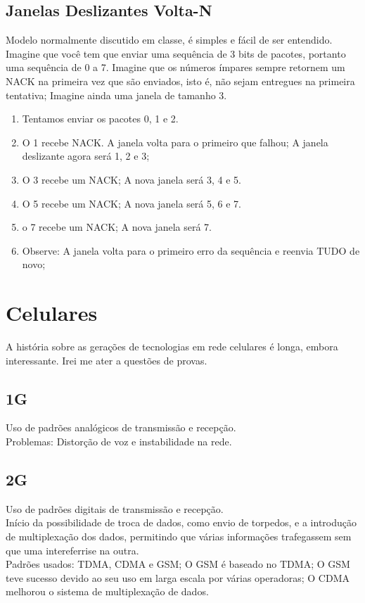 \documentclass{article}
\begin{document}
\subsection{Janelas Deslizantes Volta-N}
Modelo normalmente discutido em classe, é simples e fácil de ser entendido.\\
Imagine que você tem que enviar uma sequência de 3 bits de pacotes, portanto uma sequência de 0 a 7. Imagine que os números ímpares sempre retornem um NACK na primeira vez que são enviados, isto é, não sejam entregues na primeira tentativa; Imagine ainda uma janela de tamanho 3.\\
\begin{enumerate}
	\item Tentamos enviar os pacotes 0, 1 e 2.
	\item O 1 recebe NACK. A janela volta para o primeiro que falhou; A janela deslizante agora será 1, 2 e 3;
	\item O 3 recebe um NACK; A nova janela será 3, 4 e 5.
	\item O 5 recebe um NACK; A nova janela será 5, 6 e 7.
	\item o 7 recebe um NACK; A nova janela será 7.
	\item Observe: A janela volta para o primeiro erro da sequência e reenvia TUDO de novo;
\end{enumerate}

\section{Celulares}

A história sobre as gerações de tecnologias em rede celulares é longa, embora
interessante. Irei me ater a questões de provas.

\subsection{1G}
Uso de padrões analógicos de transmissão e recepção.\\
Problemas: Distorção de voz e instabilidade na rede.

\subsection{2G}
Uso de padrões digitais de transmissão e recepção.\\
Início da possibilidade de troca de dados, como envio de torpedos, e a introdução
de multiplexação dos dados, permitindo que várias informações trafegassem sem
que uma intereferrise na outra.\\
Padrões usados: TDMA, CDMA e GSM; O GSM é baseado no TDMA; O GSM teve sucesso
devido ao seu uso em larga escala por várias operadoras; O CDMA melhorou o
sistema de multiplexação de dados.
\end{document}
